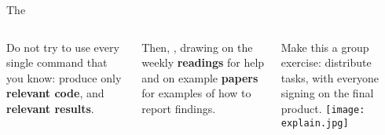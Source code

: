 \documentclass[t]{beamer}
\begin{document}
	
	
	\begin{frame}[t]{The }
		\begin{columns}[T]
			Do not try to use every single command that you know: produce only \textbf{relevant code}, and \textbf{relevant results}.\vspace{1em}%
			
			Then, \textbf{}, drawing on the weekly \textbf{readings} for help and on example \textbf{papers} for examples of how to report findings.\vspace{1em}%
			
			Make this a group exercise: distribute tasks, with everyone signing on the final product.%
			\texttt{[image: explain.jpg]}
		\end{columns}
	\end{frame}
	
\end{document}

